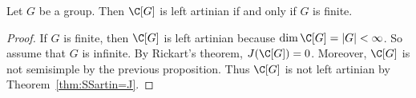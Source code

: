 
\begin{theorem}
	Let $G$ be a group. Then $\C[G]$ 
	is left artinian if and only if 
	$G$ is finite. 
\end{theorem}

\begin{proof}
    If $G$ is finite, then $\C[G]$ is left artinian because $\dim\C[G]=|G|<\infty$. So assume that 
    $G$ is infinite. By Rickart's theorem,   
	$J(\C[G])=0$. Moreover, $\C[G]$
	is not semisimple by the previous proposition. Thus
	$\C[G]$ is not left artinian by Theorem~\ref{thm:SSartin=J}.
\end{proof}


